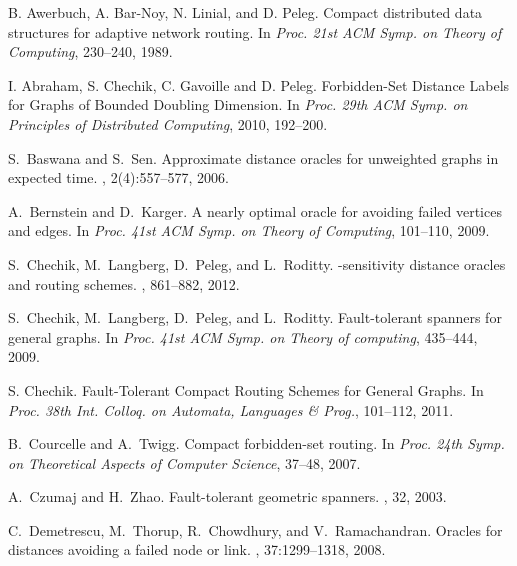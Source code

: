 \documentclass[12pt]{article}
\begin{document}
\begin{thebibliography}{10}



B. Awerbuch, A. {Bar-Noy}, N. Linial, and D. Peleg.
\newblock Compact distributed data structures for adaptive network routing.
\newblock
In {\em Proc. 21st ACM Symp. on Theory of Computing},
230--240, 1989.






I. Abraham, S. Chechik, C. Gavoille and D. Peleg.
\newblock Forbidden-Set Distance Labels for Graphs of Bounded Doubling
Dimension.
\newblock
In {\em Proc. 29th ACM Symp. on Principles of Distributed Computing},
2010, 192--200.


S.~Baswana and S.~Sen.
\newblock Approximate distance oracles for unweighted graphs in expected
  {} time.
, 2(4):557--577, 2006.


A.~Bernstein and D.~Karger.
\newblock A nearly optimal oracle for avoiding failed vertices and edges.
\newblock
In {\em Proc. 41st ACM Symp. on Theory of Computing},
101--110, 2009.


S.~Chechik, M.~Langberg, D.~Peleg, and L.~Roditty.
\newblock -sensitivity distance oracles and routing schemes.
, 861--882, 2012.

S.~Chechik, M.~Langberg, D.~Peleg, and L.~Roditty.
\newblock Fault-tolerant spanners for general graphs.
\newblock
In {\em Proc. 41st ACM Symp. on Theory of computing},
435--444, 2009.

S. Chechik.
\newblock Fault-Tolerant Compact Routing Schemes for General Graphs.
\newblock
In {\em Proc. 38th Int. Colloq. on Automata, Languages \& Prog.},
101--112, 2011.



B.~Courcelle and A.~Twigg.
\newblock Compact forbidden-set routing.
\newblock
In {\em Proc. 24th Symp. on Theoretical Aspects of Computer Science},
37--48, 2007.

A.~Czumaj and H.~Zhao.
\newblock Fault-tolerant geometric spanners.
, 32, 2003.

C.~Demetrescu, M.~Thorup, R.~Chowdhury, and V.~Ramachandran.
\newblock Oracles for distances avoiding a failed node or link.
, 37:1299--1318, 2008.


\end{thebibliography}
\end{document}
